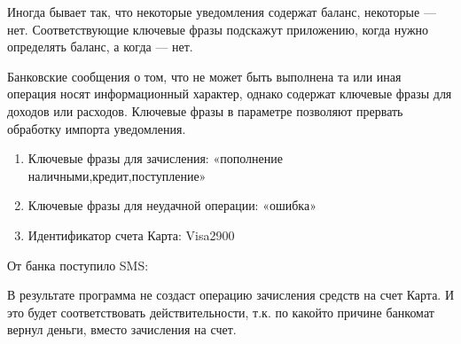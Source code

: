 \documentclass[a4paper,10pt,russian]{sphinxmanual}
\begin{document}
\noindent{}

\noindent{}

\sphinxAtStartPar
Иногда бывает так, что некоторые уведомления содержат баланс, некоторые — нет. Соответствующие ключевые фразы
подскажут приложению, когда нужно определять баланс, а когда — нет.

\sphinxAtStartPar
Банковские сообщения о том, что не может быть выполнена та или иная операция носят информационный характер,
однако содержат ключевые фразы для доходов или расходов. Ключевые фразы в параметре  позволяют
прервать обработку импорта уведомления.
\begin{description}
\begin{enumerate}
%
\item {} 
\sphinxAtStartPar
Ключевые фразы для зачисления: «пополнение наличными,кредит,поступление»

\item {} 
\sphinxAtStartPar
Ключевые фразы для неудачной операции: «ошибка»

\item {} 
\sphinxAtStartPar
Идентификатор счета Карта: Visa2900

\end{enumerate}

\end{description}

\sphinxAtStartPar
От банка поступило SMS:

\begin{sphinxVerbatim}[commandchars=\\\{\}]
           
\end{sphinxVerbatim}

\sphinxAtStartPar
В результате программа не создаст операцию зачисления средств на счет Карта. И это будет соответствовать действительности,
т.к. по какой\sphinxhyphen{}то причине банкомат вернул деньги, вместо зачисления на счет.
\end{document}
